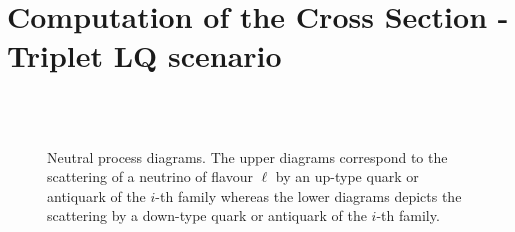 \documentclass[aps,preprint,tightenlines,floatfix,superscriptaddress,nofootinbib,showpacs]{revtex4-1}
\begin{document}
\section{Computation of the Cross Section - Triplet LQ scenario}
\begin{center}
\begin{figure}[H]
\centering
\hspace*{0.2\textwidth}
\\[8mm]
\hspace*{0.2\textwidth}
\\
\caption{Neutral process diagrams. The upper diagrams correspond to the scattering of a neutrino of flavour $\ell$ by an up-type quark or antiquark of the $i$-th family whereas the lower diagrams depicts the scattering by a down-type quark or antiquark of the $i$-th family.}
\label{fig4}
\end{figure}
\end{center}
\par
\end{document}
